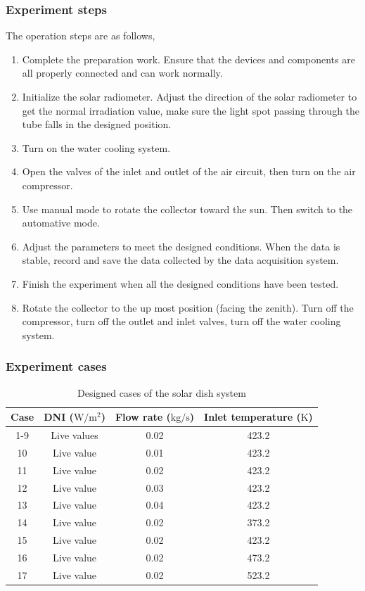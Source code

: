 \subsubsection{Experiment steps}
 The operation steps are as follows,
\begin{enumerate}[label=(\arabic*)]
	\item Complete the preparation work. Ensure that the devices and components are all properly connected and can work normally.
	\item Initialize the solar radiometer. Adjust the direction of the solar radiometer to get the normal irradiation value, make sure the light spot passing through the tube falls in the designed position.
	\item Turn on the water cooling system.
	\item Open the valves of the inlet and outlet of the air circuit, then turn on the air compressor.
	\item Use manual mode to rotate the collector toward the sun. Then switch to the automative mode.
	\item Adjust the parameters to meet the designed conditions. When the data is stable, record and save the data collected by the data acquisition system.
	\item Finish the experiment when all the designed conditions have been tested. 
	\item Rotate the collector to the up most position (facing the zenith). Turn off the compressor, turn off the outlet and inlet valves, turn off the water cooling system.
\end{enumerate}

\subsubsection{Experiment cases}

\begin{table}[htbp]\footnotesize
	\caption{Designed cases of the solar dish system}
	\begin{center}
	\begin{tabular}{cccc}
		\toprule
		Case	& DNI ($\mathrm{W/m^2}$)	&	Flow rate ($\mathrm{kg/s}$)			&	Inlet temperature ($\mathrm{K}$)\\
		\midrule
		1-9	&	Live values	&	0.02	&	423.2\\
		10	&	Live value	&	0.01	&	423.2\\
		11	&	Live value	&	0.02	&	423.2\\
		12	&	Live value	&	0.03	&	423.2\\
		13	&	Live value	&	0.04	&	423.2\\
		14	&	Live value	&	0.02	&	373.2\\
		15	&	Live value	&	0.02	&	423.2\\
		16	&	Live value	&	0.02	&	473.2\\
		17	&	Live value	&	0.02	&	523.2\\
		\bottomrule
	\end{tabular}
	\end{center}
	\label{tab:DesignedCasesForDish}
\end{table}

